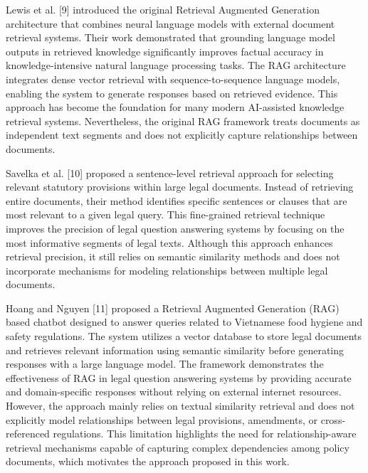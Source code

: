 \documentclass[conference]{IEEEtran}
\begin{document}
Lewis et al. [9] introduced the original Retrieval Augmented Generation architecture that combines neural language models with external document retrieval systems. Their work demonstrated that grounding language model outputs in retrieved knowledge significantly improves factual accuracy in knowledge-intensive natural language processing tasks. The RAG architecture integrates dense vector retrieval with sequence-to-sequence language models, enabling the system to generate responses based on retrieved evidence. This approach has become the foundation for many modern AI-assisted knowledge retrieval systems. Nevertheless, the original RAG framework treats documents as independent text segments and does not explicitly capture relationships between documents.

Savelka et al. [10] proposed a sentence-level retrieval approach for selecting relevant statutory provisions within large legal documents. Instead of retrieving entire documents, their method identifies specific sentences or clauses that are most relevant to a given legal query. This fine-grained retrieval technique improves the precision of legal question answering systems by focusing on the most informative segments of legal texts. Although this approach enhances retrieval precision, it still relies on semantic similarity methods and does not incorporate mechanisms for modeling relationships between multiple legal documents.

Hoang and Nguyen [11] proposed a Retrieval Augmented Generation (RAG) based chatbot designed to answer queries related to Vietnamese food hygiene and safety regulations. The system utilizes a vector database to store legal documents and retrieves relevant information using semantic similarity before generating responses with a large language model. The framework demonstrates the effectiveness of RAG in legal question answering systems by providing accurate and domain-specific responses without relying on external internet resources. However, the approach mainly relies on textual similarity retrieval and does not explicitly model relationships between legal provisions, amendments, or cross-referenced regulations. This limitation highlights the need for relationship-aware retrieval mechanisms capable of capturing complex dependencies among policy documents, which motivates the approach proposed in this work.
\end{document}
